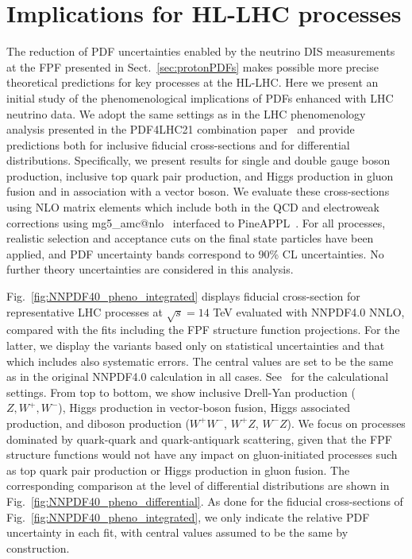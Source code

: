 \clearpage
\section{Implications for HL-LHC processes}
\label{sec:pheno}

The reduction of PDF uncertainties enabled by the neutrino DIS measurements
at the FPF presented in Sect.~\ref{sec:protonPDFs}
makes possible more precise theoretical predictions for key processes at the
HL-LHC.
%
Here we present an initial study of the phenomenological implications
of PDFs enhanced with LHC neutrino data.
%
We adopt the same settings as in the LHC phenomenology analysis presented
in the PDF4LHC21 combination paper~\cite{PDF4LHCWorkingGroup:2022cjn} and provide predictions
both for inclusive fiducial cross-sections and for differential distributions.
%
Specifically, we present results for 
single and double gauge boson production, inclusive top quark pair production,
and Higgs production in gluon
fusion and in association with a vector boson.
%
We evaluate these cross-sections using NLO matrix elements
which include  both in the
QCD and electroweak corrections using
{\sc\small mg5\_amc@nlo}~\cite{Frederix:2018nkq}
interfaced to {\sc\small PineAPPL}~\cite{Carrazza:2020gss}.
%
For all processes, realistic selection and acceptance cuts on the final state particles
have been applied, and PDF uncertainty bands correspond to 90\% CL
uncertainties.
%
No further theory uncertainties are considered in this
analysis.

Fig.~\ref{fig:NNPDF40_pheno_integrated} displays
fiducial cross-section for representative LHC processes at $\sqrt{s}=14$ TeV
evaluated with NNPDF4.0 NNLO, compared with the fits including the FPF structure function projections.
%
For the latter, we display the variants based only on statistical uncertainties and that
which includes also systematic errors.
%
The central values are set to be the same as in the original NNPDF4.0 calculation in all cases.
%
See~\cite{NNPDF:2021njg} for the calculational settings.
%
From top to bottom, we show inclusive Drell-Yan production ($Z, W^+, W^-$), Higgs production
in vector-boson fusion, Higgs associated
production, and diboson production ($W^+W^-$, $W^+Z$, $W^-Z$).
%
We focus on processes dominated by quark-quark and quark-antiquark scattering, given
that the FPF structure functions would not have any impact on gluon-initiated
processes such as top quark pair production or Higgs production in gluon fusion.
%
The corresponding comparison at the level of differential distributions
are shown in Fig.~\ref{fig:NNPDF40_pheno_differential}.
%
As done for the fiducial cross-sections of Fig.~\ref{fig:NNPDF40_pheno_integrated},
we only indicate the relative PDF uncertainty in each fit, with central values
assumed to be the same by construction.


